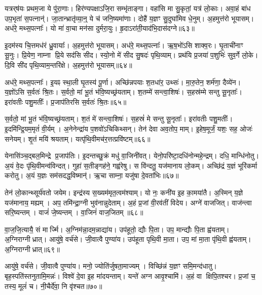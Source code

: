 यत्रर्‌\mbox{}ष॑यः प्रथम॒जा ये पु॑रा॒णाः।
हिर॑ण्यपक्षा\-ऽजि॒रा सम्भृ॑ताङ्गा।
वहा॑सि मा सु॒कृतां॒ यत्र॑ लो॒काः।
अवा॒हं बा॑ध उप॒भृता॑ स॒पत्नान्॑।
जा॒तान्भ्रातृ॑व्या॒न्॒ ये च॑ जनि॒ष्यमा॑णाः।
दोहै॑ य॒ज्ञꣳ सु॒दुघा॑मिव धे॒नुम्।
अ॒हमुत्त॑रो भूयासम्।
अध॑रे॒ मथ्स॒पत्नाः᳚।
यो मा॑ वा॒चा मन॑सा दुर्मरा॒युः।
हृ॒दा\-ऽरा॑ती॒याद॑भि॒दास॑दग्ने॥६३॥

इ॒दम॑स्य चि॒त्तमध॑रं ध्रु॒वायाः᳚।
अ॒हमुत्त॑रो भूयासम्।
अध॑रे॒ मथ्स॒पत्नाः᳚।
ऋ॒ष॒भो॑ऽसि शाक्व॒रः।
घृ॒ताची॑नाꣳ सू॒नुः।
प्रि॒येण॒ नाम्ना प्रि॒ये सद॑सि सीद।
स्यो॒नो मे॑ सीद सु॒षदः॑ पृथि॒व्याम्।
प्रथ॑यि प्र॒जया॑ प॒शुभिः॑ सुव॒र्गे लो॒के।
दि॒वि सी॑द पृथि॒व्याम॒न्तरि॑क्षे।
अ॒हमुत्त॑रो भूयासम्॥६४॥

अध॑रे॒ मथ्स॒पत्नाः᳚।
इ॒यꣴ स्था॒ली घृ॒तस्य॑ पू॒र्णा।
अच्छि॑न्नपयाः श॒तधा॑र॒ उथ्सः॑।
मा॒रु॒तेन॒ शर्म॑णा॒ दैव्ये॑न।
य॒ज्ञो॑ऽसि स॒र्वतः॑ श्रि॒तः।
स॒र्वतो॒ मां भू॒तं भ॑वि॒ष्यच्छ्र॑यताम्।
श॒तम्मे॑ सन्त्वा॒शिषः॑।
स॒हस्र॑म्मे सन्तु सू॒नृताः᳚।
इरा॑वतीः पशु॒मतीः᳚।
प्र॒जाप॑तिरसि स॒र्वतः॑ श्रि॒तः॥६५॥

स॒र्वतो॒ मां भू॒तं भ॑वि॒ष्यच्छ्र॑यताम्।
श॒तं मे॑ सन्त्वा॒शिषः॑।
स॒हस्रं॑ मे सन्तु सू॒नृताः᳚।
इरा॑वतीः पशु॒मतीः᳚।
इ॒दमि॑न्द्रि॒यम॒मृतं॑ वी॒र्यम्।
अ॒नेनेन्द्रा॑य प॒शवो॑\-ऽचिकिथ्सन्।
तेन॑ देवा अव॒तोप॒ माम्।
इ॒हेष॒मूर्जं॒ यशः॒ सह॒ ओजः॑ सनेयम्।
शृ॒तं मयि॑ श्रयताम्।
यत्पृ॑थि॒वीमच॑र॒त्तत्प्रवि॑ष्टम्॥६६॥

येनासि॑ञ्च॒द्बल॒मिन्द्रे प्र॒जाप॑तिः।
इ॒दन्तच्छु॒क्रं मधु॑ वा॒जिनी॑वत्।
येनो॒परि॑ष्टा॒दधि॑नोन्महे॒न्द्रम्।
दधि॒ मान्धि॑नोतु।
अ॒यं वे॒दः पृ॑थि॒वीमन्व॑विन्दत्।
गुहा॑ स॒तीङ्गह॑ने॒ गह्व॑रेषु।
स वि॑न्दतु॒ यज॑मानाय लो॒कम्।
अच्छि॑द्रं य॒ज्ञं भूरि॑कर्मा करोतु।
अ॒यं य॒ज्ञः सम॑सदद्ध॒विष्मान्॑।
ऋ॒चा साम्ना॒ यजु॑षा दे॒वता॑भिः॥६७॥

तेन॑ लो॒कान्थ्सूर्य॑वतो जयेम।
इन्द्र॑स्य स॒ख्यम॑मृत॒त्वम॑श्याम्।
यो नः॒ कनी॑य इ॒ह का॒मया॑तै।
अ॒स्मिन् य॒ज्ञे यज॑मानाय॒ मह्यम्।
अप॒ तमि॑न्द्रा॒ग्नी भुव॑नान्नुदेताम्।
अ॒हं प्र॒जां वी॒रव॑तीं विदेय।
अग्ने॑ वाजजित्।
वाज॑न्त्वा सरि॒ष्यन्तम्।
वाजं॑ जे॒ष्यन्तम्।
वा॒जिनं॑ वाज॒जितम्॥६८॥

वा॒ज॒जि॒त्यायै॒ सं मार्ज्मि।
अ॒ग्निम॑न्ना॒दम॒न्नाद्या॑य।
उप॑हूतो॒ द्यौः पि॒ता।
उप॒ मान्द्यौः पि॒ता ह्व॑यताम्।
अ॒ग्निराग्नीध्रात्।
आयु॑षे॒ वर्च॑से।
जी॒वात्वै पुण्या॑य।
उप॑हूता पृथि॒वी मा॒ता।
उप॒ मां मा॒ता पृ॑थि॒वी ह्व॑यताम्।
अ॒ग्निराग्नीध्रात्॥६९॥

आयु॑षे॒ वर्च॑से।
जी॒वात्वै पुण्या॑य।
मनो॒ ज्योति॑र्जुषता॒माज्यम्।
विच्छि॑न्नं य॒ज्ञꣳ समि॒मन्द॑धातु।
बृह॒स्पति॑स्तनुतामि॒मन्नः॑।
विश्वे॑ दे॒वा इ॒ह मा॑दयन्ताम्।
यन्ते॑ अग्न आवृ॒श्चामि॑।
अ॒हं वा क्षिपि॒तश्चर\sn{}।
प्र॒जां च॒ तस्य॒ मूलं॑ च।
नी॒चैर्दे॑वा॒ नि वृ॑श्चत॥७०॥

